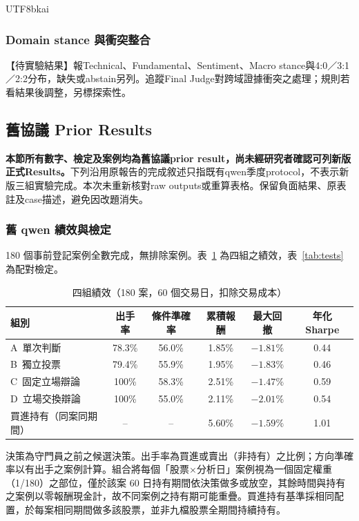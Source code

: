 \documentclass[12pt,a4paper]{article}
\newcommand{\grp}[1]{\textsf{#1}}
\begin{document}
\begin{CJK}{UTF8}{bkai}
\subsubsection{Domain stance 與衝突整合}
【待實驗結果】報Technical、Fundamental、Sentiment、Macro stance與4:0／3:1／2:2分布，缺失或abstain另列。追蹤Final Judge對跨域證據衝突之處理；規則若看結果後調整，另標探索性。

\subsection{舊協議 Prior Results}

\noindent\textbf{本節所有數字、檢定及案例均為舊協議prior result，尚未經研究者確認可列新版正式Results。}下列沿用原報告的完成敘述只指既有qwen季度protocol，不表示新版三組實驗完成。本次未重新核對raw outputs或重算表格。保留負面結果、原表註及case描述，避免因改題消失。

\subsubsection{舊 qwen 績效與檢定}
180 個事前登記案例全數完成，無排除案例。表~\ref{tab:main} 為四組之績效，表~\ref{tab:tests} 為配對檢定。

\begin{table}[H]
\centering\small
\caption{四組績效（180 案，60 個交易日，扣除交易成本）}
\label{tab:main}
\begin{tabular}{@{}lccccc@{}}
\toprule
組別 & 出手率 & 條件準確率 & 累積報酬 & 最大回撤 & 年化 Sharpe \\
\midrule
\grp{A}\ 單次判斷 & 78.3\% & 56.0\% & 1.85\% & $-1.81\%$ & 0.44 \\
\grp{B}\ 獨立投票 & 79.4\% & 55.9\% & 1.95\% & $-1.83\%$ & 0.46 \\
\grp{C}\ 固定立場辯論 & 100\% & 58.3\% & 2.51\% & $-1.47\%$ & 0.59 \\
\grp{D}\ 立場交換辯論 & 100\% & 55.0\% & 2.11\% & $-2.01\%$ & 0.54 \\
\midrule
買進持有（同案同期間） & -- & -- & 5.60\% & $-1.59\%$ & 1.01 \\
\bottomrule
\end{tabular}
\par\smallskip
\raggedright\footnotesize 決策為守門員之前之候選決策。出手率為買進或賣出（非持有）之比例；方向準確率以有出手之案例計算。組合將每個「股票×分析日」案例視為一個固定權重（1/180）之部位，僅於該案 60 日持有期間依決策做多或放空，其餘時間與持有之案例以零報酬現金計，故不同案例之持有期可能重疊。買進持有基準採相同配置，於每案相同期間做多該股票，並非九檔股票全期間持續持有。
\end{table}


\end{CJK}
\end{document}
